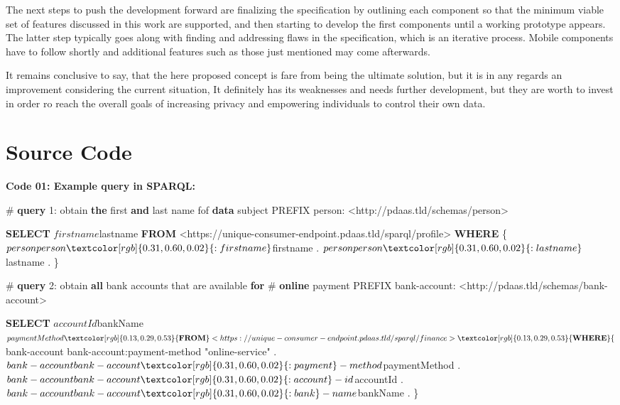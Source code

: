 \documentclass[12pt,english,a4paper,titlepage,cleardoublepage=empty,dottedtoc]{report}
\newenvironment{Shaded}{\begin{snugshade}}{\end{snugshade}}
\newcommand{\KeywordTok}[1]{\textcolor[rgb]{0.13,0.29,0.53}{\textbf{#1}}}
\newcommand{\DecValTok}[1]{\textcolor[rgb]{0.00,0.00,0.81}{#1}}
\newcommand{\CharTok}[1]{\textcolor[rgb]{0.31,0.60,0.02}{#1}}
\newcommand{\OtherTok}[1]{\textcolor[rgb]{0.56,0.35,0.01}{#1}}
\newcommand{\FunctionTok}[1]{\textcolor[rgb]{0.00,0.00,0.00}{#1}}
\newcommand{\NormalTok}[1]{#1}
\begin{document}
The next steps to push the development forward are finalizing the
specification by outlining each component so that the minimum viable set
of features discussed in this work are supported, and then starting to
develop the first components until a working prototype appears. The
latter step typically goes along with finding and addressing flaws in
the specification, which is an iterative process. Mobile components have
to follow shortly and additional features such as those just mentioned
may come afterwards.

It remains conclusive to say, that the here proposed concept is fare
from being the ultimate solution, but it is in any regards an
improvement considering the current situation, It definitely has its
weaknesses and needs further development, but they are worth to invest
in order ro reach the overall goals of increasing privacy and empowering
individuals to control their own data.

\chapter*{Source Code}\label{source-code}

 \setcounter{page}{6} \pagestyle{plain}

\textbf{\protect\hypertarget{code-01_sparql-query}{}{Code 01: Example
query in SPARQL}:}

\begin{Shaded}
\begin{Highlighting}[numbers=left,,]
\NormalTok{# }\KeywordTok{query} \DecValTok{1}\NormalTok{: obtain }\KeywordTok{the} \FunctionTok{first} \KeywordTok{and} \FunctionTok{last}\NormalTok{ name fof }\KeywordTok{data}\NormalTok{ subject}
\NormalTok{PREFIX person: <http://pdaas.tld/schemas/person>}

\KeywordTok{SELECT}\NormalTok{ $firstname $lastname}
\KeywordTok{FROM}\NormalTok{ <https://unique-consumer-endpoint.pdaas.tld/sparql/profile>}
\KeywordTok{WHERE}\NormalTok{ \{}
\NormalTok{    $person person}\CharTok{:firstname}\NormalTok{ $firstname .}
\NormalTok{    $person person}\CharTok{:lastname}\NormalTok{ $lastname .}
\NormalTok{\}}


\NormalTok{# }\KeywordTok{query} \DecValTok{2}\NormalTok{: obtain }\KeywordTok{all}\NormalTok{ bank accounts that are available }\KeywordTok{for} 
\NormalTok{# }\KeywordTok{online}\NormalTok{ payment}
\NormalTok{PREFIX bank-account: <http://pdaas.tld/schemas/bank-account>}

\KeywordTok{SELECT}\NormalTok{ $accountId $bankName $paymentMethod}
\KeywordTok{FROM}\NormalTok{ <https://unique-consumer-endpoint.pdaas.tld/sparql/finance>}
\KeywordTok{WHERE}\NormalTok{ \{}
\NormalTok{    $bank-account bank-account}\CharTok{:payment}\NormalTok{-method }\OtherTok{"online-service"}\NormalTok{ .}
\NormalTok{    $bank-account bank-account}\CharTok{:payment}\NormalTok{-method $paymentMethod .}
\NormalTok{    $bank-account bank-account}\CharTok{:account}\NormalTok{-id $accountId . }
\NormalTok{    $bank-account bank-account}\CharTok{:bank}\NormalTok{-name $bankName .}
\NormalTok{\}}
\end{Highlighting}
\end{Shaded}
\end{document}
